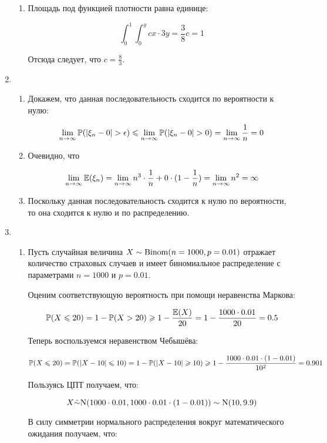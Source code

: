 \begin{enumerate}
\begin{enumerate}
\item Площадь под функцией плотности равна единице:

\[
	\int_{0}^{1}\int_{0}^{y}cx \cdot 3y=\frac{3}{8}c=1
\]

Отсюда следует, что $c=\frac{8}{3}$.

\end{enumerate}

\item 

\begin{enumerate}
\item Докажем, что данная последовательность сходится по вероятности к нулю:

\[
	\lim_{n\to\infty}\P(|\xi_{n}-0| > \epsilon) \leq \lim_{n\to\infty}\P(|\xi_{n}-0|>0)=
	\lim_{n\to\infty}\frac{1}{n} = 0
\]

\item Очевидно, что

\[
	\lim_{n\to\infty} \E(\xi_{n})=\lim_{n\to\infty}n^3 \cdot \frac{1}{n}+0\cdot (1-\frac{1}{n})=\lim_{n\to\infty} n^2=\infty
\]

\item Поскольку данная последовательность сходится к нулю по вероятности, то она сходится к нулю и по распределению.

\end{enumerate}

\item

\begin{enumerate}
\item Пусть случайная величина $X\sim \cBin(n=1000, p=0.01)$ отражает количество страховых случаев и имеет биномиальное распределение с параметрами $n=1000$ и $p=0.01$.

Оценим соответствующую вероятность при помощи неравенства Маркова:

\[
	\P(X\leq 20) = 1 - \P(X > 20) \geq 1 - \frac{\E(X)}{20} 
	= 1 - \frac{1000 \cdot 0.01}{20} = 0.5
\]

Теперь воспользуемся неравенством Чебышёва:

\[
	\P(X\leq 20) = \P(|X-10|\leq 10)
	= 1 - \P(|X - 10|\geq 10) \geq 1 - \frac{1000\cdot 0.01\cdot (1-0.01)}{10^2}
	= 0.901
\]

Пользуясь ЦПТ получаем, что:

\[
	X\dot\sim \cN(1000\cdot 0.01, 1000\cdot 0.01 \cdot (1-0.01)) \sim \cN(10, 9.9)
\]

В силу симметрии нормального распределения вокруг математического ожидания получаем, что:


\end{enumerate}
\end{enumerate}
